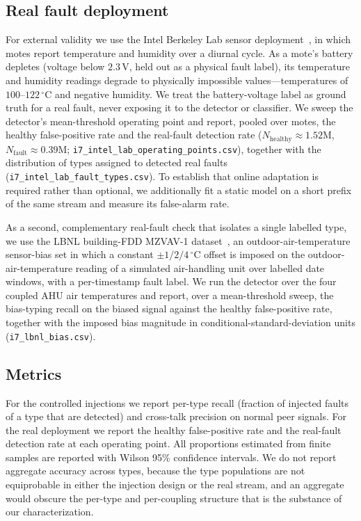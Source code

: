 \subsection{Real fault deployment}
For external validity we use the Intel Berkeley Lab sensor deployment~\citep{IntelLab2004}, in which motes report temperature and humidity over a diurnal cycle. As a mote's battery depletes (voltage below $2.3$\,V, held out as a physical fault label), its temperature and humidity readings degrade to physically impossible values---temperatures of $100$--$122$\,$^{\circ}$C and negative humidity. We treat the battery-voltage label as ground truth for a real fault, never exposing it to the detector or classifier. We sweep the detector's mean-threshold operating point and report, pooled over motes, the healthy false-positive rate and the real-fault detection rate ($N_\mathrm{healthy} \approx 1.52$M, $N_\mathrm{fault} \approx 0.39$M; \texttt{i7\_intel\_lab\_operating\_points.csv}), together with the distribution of types assigned to detected real faults (\texttt{i7\_intel\_lab\_fault\_types.csv}). To establish that online adaptation is required rather than optional, we additionally fit a static model on a short prefix of the same stream and measure its false-alarm rate.

As a second, complementary real-fault check that isolates a single labelled type, we use the LBNL building-FDD MZVAV-1 dataset~\citep{LBNL_FDD2019,Granderson2023}, an outdoor-air-temperature sensor-bias set in which a constant $\pm 1/2/4\,^\circ$C offset is imposed on the outdoor-air-temperature reading of a simulated air-handling unit over labelled date windows, with a per-timestamp fault label. We run the detector over the four coupled AHU air temperatures and report, over a mean-threshold sweep, the bias-typing recall on the biased signal against the healthy false-positive rate, together with the imposed bias magnitude in conditional-standard-deviation units (\texttt{i7\_lbnl\_bias.csv}).

\subsection{Metrics}
For the controlled injections we report per-type recall (fraction of injected faults of a type that are detected) and cross-talk precision on normal peer signals. For the real deployment we report the healthy false-positive rate and the real-fault detection rate at each operating point. All proportions estimated from finite samples are reported with Wilson 95\% confidence intervals. We do not report aggregate accuracy across types, because the type populations are not equiprobable in either the injection design or the real stream, and an aggregate would obscure the per-type and per-coupling structure that is the substance of our characterization.
